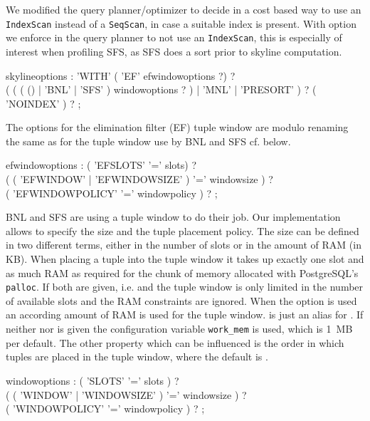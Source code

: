 We modified the query planner/optimizer to decide in a cost based way to use
an \texttt{IndexScan} instead of a \texttt{SeqScan}, in case a suitable
index is present.  With  option we enforce in the
query planner to not use an \texttt{IndexScan}, this is especially of
interest when profiling SFS, as SFS does a sort prior to skyline
computation.

\begin{rail}
skylineoptions : 
    'WITH' 
    ( 'EF' efwindowoptions ?) ? \\
    ( ( ( () | 'BNL' | 'SFS' ) windowoptions ? ) | 'MNL' | 'PRESORT' ) ? 
    ( 'NOINDEX' ) ? ;
\end{rail}

The options for the elimination filter (EF) tuple window
 are modulo renaming the same as for the tuple window
use by BNL and SFS cf.  below.

\begin{rail}
efwindowoptions : 
    ( 'EFSLOTS' '=' slots) ? \\
    ( ( 'EFWINDOW' | 'EFWINDOWSIZE' ) '=' windowsize ) ? \\
    ( 'EFWINDOWPOLICY' '=' windowpolicy ) ? ;
\end{rail}

BNL and SFS are using a tuple window to do their job. Our
implementation allows to specify the size and the tuple placement
policy. The size can be defined in two different terms, either
in the number of slots or in the amount of RAM (in KB). When placing
a tuple into the tuple window it takes up exactly one slot and
as much RAM as required for the chunk of memory allocated with PostgreSQL's
\texttt{palloc}. If both are given, i.e.  and 
the tuple window is only limited in the number of available slots and
the RAM constraints are ignored. When the 
option is used an according amount of RAM is used for the tuple window.
 is just an alias for .  If
neither  nor  is given the
configuration variable \texttt{work\_mem} is used, which is 1~MB per
default. The other property which can be influenced is the order in which
tuples are placed in the tuple window, where the default is .

\begin{rail}
windowoptions : 
    ( 'SLOTS' '=' slots ) ? \\
    ( ( 'WINDOW' | 'WINDOWSIZE' ) '=' windowsize ) ? \\ 
    ( 'WINDOWPOLICY' '=' windowpolicy ) ? ;
\end{rail}

